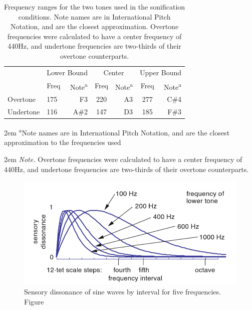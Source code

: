 \documentclass[10pt,a4paper,onecolumn]{article}
\begin{document}
\begin{table}[!h]

\begin{threeparttable}
\caption{\label{tab:frequency-ranges}Frequency ranges for the two tones used in the sonification conditions. Note names are in International Pitch Notation, and are the closest approximation. Overtone frequencies were calculated to have a center frequency of 440Hz, and undertone frequencies are two-thirds of their overtone counterparts.}
\centering
\fontsize{7}{9}\selectfont
\begin{tabular}[t]{>{}l>{}l>{}r>{}c>{}r>{}c>{}r}
\toprule
\multicolumn{1}{c}{} & \multicolumn{2}{c}{Lower Bound} & \multicolumn{2}{c}{Center} & \multicolumn{2}{c}{Upper Bound} \\
\cmidrule(l{3pt}r{3pt}){2-3} \cmidrule(l{3pt}r{3pt}){4-5} \cmidrule(l{3pt}r{3pt}){6-7}
  & Freq & Note\textsuperscript{a} & Freq & Note\textsuperscript{a} & Freq & Note\textsuperscript{a}\\
\midrule
Overtone & 175 & F3 & 220 & A3 & 277 & C\#4\\
Undertone & 116 & A\#2 & 147 & D3 & 185 & F\#3\\
\bottomrule
\end{tabular}
\begin{tablenotes}
\small
\item [] 
\rightskip2em
{\footnotesize \sffamily \textsuperscript{a}Note names are in International Pitch Notation, and are the closest approximation to the frequencies used}
\item [] 
\rightskip2em
{\footnotesize \sffamily \textit{Note.} Overtone frequencies were calculated to have a center frequency of 440Hz, and undertone frequencies are two-thirds of their overtone counterparts.}
\end{tablenotes}
\end{threeparttable}
\end{table}



\begin{figure}[h]

{\centering \includegraphics[width=1\linewidth]{figures/setharesTuningTimbreSpectrum2010_p47} 

}

\caption{Sensory dissonance of sine waves by interval for five frequencies. Figure \autocite[p.~47]{setharesSoundSound2005}}\label{fig:sensory-dissonance}
\end{figure}
\end{document}

